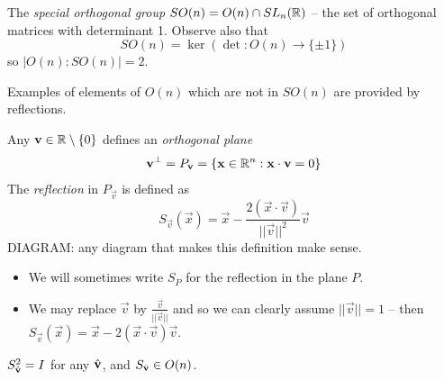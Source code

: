 \documentclass{../template/note}
\begin{document}

    \begin{definition}
        The \emph{special orthogonal group} \(SO(n) = O(n) \cap SL_n(\mathbb R)\) -- the set of orthogonal matrices with determinant 1. Observe also that
        \[
            SO(n) = \ker(\det: O(n) \to \{\pm 1\})
        \]
        so \(|O(n):SO(n)| = 2\).
    \end{definition}
    Examples of elements of \(O(n)\) which are not in \(SO(n)\) are provided by reflections.

    \begin{definition}[Reflections]
        Any \(\vec v \in \RR \setminus \{0\}\) defines an \emph{orthogonal plane}
        \[
            \vec v^\perp = P_{\vec v} = \{\vec x \in \RR^n: \vec x \cdot \vec v = 0\}
        \]
        The \emph{reflection} in \(P_{\vec v}\) is defined as
        \[
            S_{\vec v}(\vec x) = \vec x - \frac{2(\vec x \cdot \vec v)}{||\vec v||^2}\vec v
        \]
        DIAGRAM: any diagram that makes this definition make sense.
    \end{definition}
    
    \begin{remark}
        \begin{itemize}
            \item We will sometimes write \(S_P\) for the reflection in the plane \(P\).
            \item We may replace \(\vec v\) by \(\frac{\vec v}{||\vec v||}\) and so we can clearly assume \(||\vec v|| = 1\) -- then \(S_{\vec v}(\vec x) = \vec x - 2(\vec x \cdot \vec v)\vec v\).
        \end{itemize}
    \end{remark}
    
    \begin{lemma}
        \(S_{\hvec v}^2 = I\) for any \(\hvec v\), and \(S_{\hvec v} \in O(n)\).
    \end{lemma}
    
\end{document}
